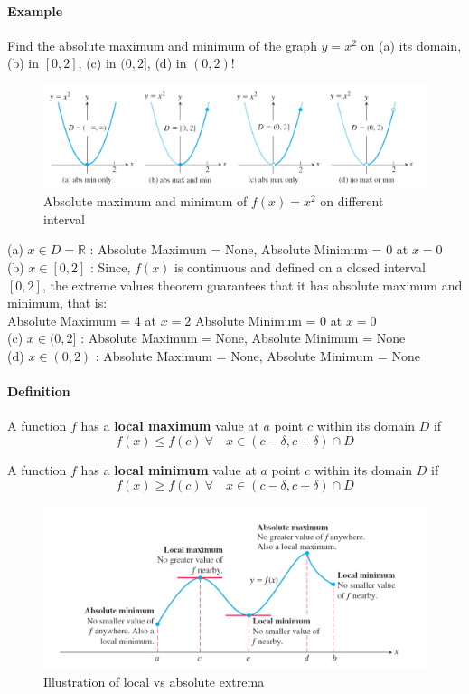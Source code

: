 \documentclass[12pt]{article}
\begin{document}
\paragraph{Example} Find the absolute maximum and minimum of the graph $y = x^2$ on (a) its domain, (b) in $[0, 2]$, (c) in $(0, 2]$, (d) in $(0, 2)$!

\begin{figure}[h!]
    \centering
    \includegraphics[width=1\linewidth]{Images/absolute max min.png}
    \caption{Absolute maximum and minimum of $f(x) = x^2$ on different interval}
\end{figure}

\noindent 
(a) $x \in D = \mathbb{R}$ : Absolute Maximum = None, Absolute Minimum = 0 at $x = 0$ \\
(b) $x \in [0, 2]$ : Since, $f(x)$ is continuous and defined on a closed interval $[0, 2]$, the extreme values theorem guarantees that it has absolute maximum and minimum,
that is: \\
Absolute Maximum = 4 at $x = 2$ Absolute Minimum = 0 at $x = 0$ \\
(c) $x \in (0, 2]$ : Absolute Maximum = None, Absolute Minimum = None \\
(d) $x \in (0, 2)$ : Absolute Maximum = None, Absolute Minimum = None 

\paragraph{Definition}
A function $f$ has a \textbf{local maximum} value at $a$ point $c$ within its
domain $D$ if 
\[ 
    f(x) \leq f(c)\: \forall\quad x \in (c - \delta, c + \delta) \cap D
\]

\noindent 
A function $f$ has a \textbf{local minimum} value at $a$ point $c$ within its domain $D$ if
\[ 
    f(x) \geq f(c)\: \forall\quad x \in (c - \delta, c + \delta) \cap D
\]

\begin{figure}[h!]
     \centering
     \includegraphics[width=1\linewidth]{Images/absolute and local extrema.png}
     \caption{Illustration of local vs absolute extrema}
\end{figure}
\end{document}
